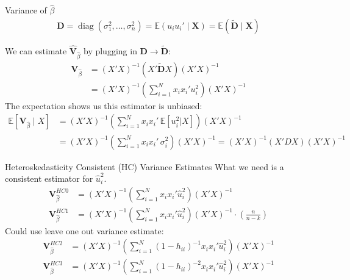 \documentclass[aspectratio=169]{beamer}
\begin{document}
\begin{frame}{Variance of $\widehat{\beta}$}
\begin{align*}
\mathbf { D } = \operatorname { diag } \left( \sigma _ { 1 } ^ { 2 } , \ldots , \sigma _ { n } ^ { 2 } \right)
= \mathbb { E } \left( u_i u_i'  \mid \mathbf { X } \right)
= \mathbb { E } \left( \widetilde{\mathbf{D}} \mid  \mathbf { X } \right)
\end{align*}

We can estimate $\widehat{\mathbf{V}}_{\widehat{\beta}}$ by plugging in $\mathbf{D} \rightarrow  \widetilde{\mathbf{D}} $:
\begin{align*}
\mathbf{V}_{\widehat{\beta}} &= (X'X)^{-1} (X'  \widetilde{\mathbf{D}} X) (X'X)^{-1} \\
&= (X'X)^{-1} \left(\sum_{i=1}^N x_i x_i' u_i^2  \right) (X'X)^{-1} 
\end{align*}
The expectation shows us this estimator is unbiased:
\begin{align*}
\mathbb{E}[\mathbf{V}_{\widehat{\beta}} \mid X]
&= (X'X)^{-1} \left(\sum_{i=1}^N x_i x_i'\, \mathbb{E}[u_i^2 | X] \right) (X'X)^{-1} \\
&= (X'X)^{-1} \left(\sum_{i=1}^N x_i x_i' \, \sigma_i^2 \right) (X'X)^{-1} = (X'X)^{-1} (X' D X) (X'X)^{-1} 
\end{align*}
\end{frame}



\begin{frame}{Heteroskedasticity Consistent (HC) Variance Estimates}
What we need is a consistent estimator for $\hat{u}^2_i$.
\begin{align*}
\mathbf{V}_{\widehat{\beta}}^{HC0}&= (X'X)^{-1} \left(\sum_{i=1}^N x_i x_i' \hat{u}_i^2 \right) (X'X)^{-1} \\
\mathbf{V}_{\widehat{\beta}}^{HC1}&= (X'X)^{-1} \left(\sum_{i=1}^N x_i x_i' \hat{u}_i^2 \right) (X'X)^{-1} \cdot \left(\frac{n}{n-k}  \right)
\end{align*}
Could use leave one out variance estimate:
\begin{align*}
\mathbf{V}_{\widehat{\beta}}^{HC2}&= (X'X)^{-1} \left(\sum_{i=1}^N (1-h_{ii})^{-1} x_i x_i' \hat{u}_i^2 \right) (X'X)^{-1} \\
\mathbf{V}_{\widehat{\beta}}^{HC3}&= (X'X)^{-1} \left(\sum_{i=1}^N (1-h_{ii})^{-2} x_i x_i' \hat{u}_i^2 \right) (X'X)^{-1} \\
\end{align*}
\end{frame}
\end{document}
